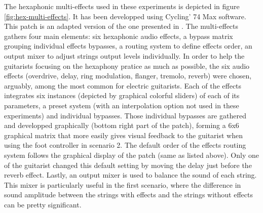 \documentclass{article}
\begin{document}
The hexaphonic multi-effects used in these experiments is depicted in figure \ref{fig:hex-multi-effects}. It has been developped using Cycling' 74 Max software. This patch is an adapted version of the one presented in \cite{Reboursiere2020_Puzzle_eng}. The multi-effects gathers four main elements: six hexaphonic audio effects, a bypass matrix grouping individual effects bypasses, a routing system to define effects order, an output mixer to adjust strings  output levels individually. 
In order to help the guitarists focusing on the hexaphony pratice as much as possible, the six audio effects (overdrive, delay, ring modulation, flanger, tremolo, reverb) were chosen, arguably, among the most common for electric guitarists. Each of the effects integrates six instances (depicted by graphical colorful sliders) of each of its parameters, a preset system (with an interpolation option not used in these experiments) and individual bypasses. 
Those individual bypasses are gathered and developped graphically (bottom right part of the patch), forming a 6x6 graphical matrix that more easily gives visual feedback to the guitarist when using the foot controller in scenario 2. 
The default order of the effects routing system follows the graphical display of the patch (same as listed above). Only one of the guitarist changed this default setting by moving the delay just before the reverb effect. 
Lastly, an output mixer is used to balance the sound of each string. This mixer is particularly useful in the first scenario, where the difference in sound amplitude between the strings with effects and the strings without effects can be pretty significant.
\end{document}
